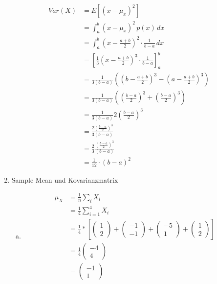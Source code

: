 \documentclass[a4paper,12pt]{article}
\begin{document}
\begin{enumerate}
{\begin{enumerate}[a)]
		\begin{align*}
			Var(X) &= E[(x - \mu_x)^2] \\
			&= \int_a^b (x-\mu_x)^2 \, p(x) \, dx \\
			&= \int_a^b (x - \frac{a+b}{2})^2 \cdot \frac{1}{b-a} \, dx \\
			&= \left[ \frac{1}{3} (x - \frac{a+b}{2})^3 \cdot \frac{1}{b-a} \right]_a^b \\
			&= \frac{1}{3(b-a)} \left( (b - \frac{a+b}{2})^3 - (a - \frac{a+b}{2})^3 \right) \\
			&= \frac{1}{3(b-a)} \left( (\frac{b-a}{2})^3 + (\frac{b-a}{2})^3 \right) \\
			&= \frac{1}{3(b-a)} 2(\frac{b-a}{2})^3 \\
			&= \frac{2(\frac{b-a}{2})^3}{3(b-a)} \\
			&= \frac{2}{3}\frac{(\frac{b-a}{2})^3}{(b-a)} \\
			&= \frac{1}{12} \cdot (b-a)^2
		\end{align*}

	\end{enumerate}

}

\item {Sample Mean und Kovarianzmatrix

	\begin{enumerate}[a)]

		\item 
		
		\begin{align*}
			\mu_X &= \frac{1}{n} \sum_{i} X_i \\
			&= \frac{1}{4} \sum_{i=1}^{4} X_i \\
			&= \frac{1}{4} * \left[ \left(\begin{array}{c} 1 \\ 2 \end{array}\right) + \left(\begin{array}{c} -1 \\ -1 \end{array}\right) + \left(\begin{array}{c} -5 \\ 1 \end{array}\right) + \left(\begin{array}{c} 1 \\ 2 \end{array}\right) \right] \\
			&= \frac{1}{4} \left(\begin{array}{c} -4 \\ 4 \end{array}\right) \\
			&= \left(\begin{array}{c} -1 \\ 1 \end{array}\right)
		\end{align*}
		

\end{enumerate}}
\end{enumerate}
\end{document}
